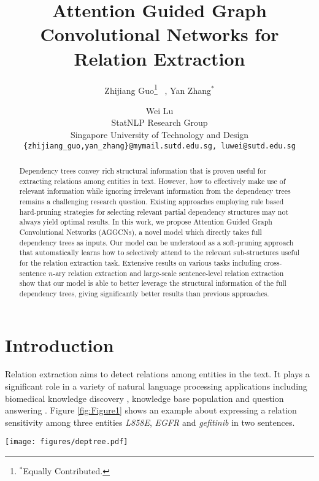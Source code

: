 \documentclass[11pt,a4paper]{article}
\title{Attention Guided Graph Convolutional Networks for Relation Extraction}
\author{Zhijiang Guo\thanks{$^{*}$Equally Contributed.} ~, Yan Zhang$^{*}$ \and Wei Lu \\
StatNLP Research Group\\
 Singapore University of Technology and Design \\
   \texttt{\{zhijiang\_guo,yan\_zhang\}@mymail.sutd.edu.sg, luwei@sutd.edu.sg}\\
}
\date{}
\begin{document}
\maketitle

\begin{abstract}
Dependency trees convey rich structural information that is proven useful for extracting relations among entities in text. However, how to effectively make use of relevant information while ignoring irrelevant information from the dependency trees remains a challenging research question. Existing approaches employing rule based hard-pruning strategies for selecting relevant partial dependency structures may not always yield optimal results. In this work, we propose Attention Guided Graph Convolutional Networks (AGGCNs), a novel model which directly takes full dependency trees as inputs. Our model can be understood as a soft-pruning approach that automatically learns how to selectively attend to the relevant sub-structures useful for the relation extraction task. Extensive results on various tasks including cross-sentence $n$-ary relation extraction and large-scale sentence-level relation extraction show that our model is able to better leverage the structural information of the full dependency trees, giving significantly better results than previous approaches.
\end{abstract}

\section{Introduction}
\label{sec:1}

Relation extraction aims to detect relations among entities in the text. It plays a significant role in a variety of natural language processing applications including biomedical knowledge discovery \citep{Quirk2017DistantSF}, knowledge base population \citep{Zhang2017PositionawareAA} and question answering \citep{Yu2017ImprovedNR}. Figure \ref{fig:Figure1} shows an example about expressing a relation sensitivity among three entities \textit{L858E}, \textit{EGFR} and \textit{gefitinib} in two sentences.

\begin{figure*}
    \centering
    \texttt{[image: figures/deptree.pdf]}
\caption{An example dependency tree for two sentences expressing a relation (sensitivity) among three entities. The shortest dependency path between these entities is highlighted in bold (edges and tokens). The root node of the LCA subtree of entities is \textit{present}. The dotted edges indicate tokens $K$=1 away from the subtree. Note that tokens \textit{partial response} off these paths (shortest dependency path, LCA subtree, pruned tree when $K$=1).}
    \label{fig:Figure1}
\end{figure*}
\end{document}
